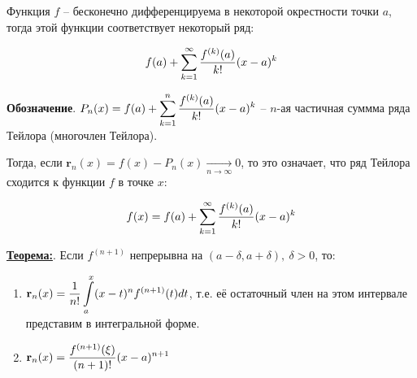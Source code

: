 \documentclass[a4paper,12pt]{article} %
\begin{document}
Функция $f$ -- бесконечно дифференцируема в некоторой окрестности точки $a$, тогда этой функции соответствует некоторый ряд: 

\begin{equation*}
\Large \displaystyle f(a) + \sum\limits_{k = 1}^{\infty} \frac{f^{(k)}(a)}{k!}(x-a)^k
\end{equation*}


\textbf{Обозначение}. $\Large \displaystyle P_n(x) = f(a) + \sum\limits_{k = 1}^{n} \frac{f^{(k)}(a)}{k!}(x-a)^k$ -- $n$-ая частичная суммма ряда Тейлора (многочлен Тейлора).

Тогда, если $\mathbf{r}_n(x) = f(x) - P_n(x) \underset{n \rightarrow \infty} \longrightarrow 0$, то это означает, что ряд Тейлора сходится к функции $f$ в точке $x$:

\begin{equation*}
\Large \displaystyle f(x) = f(a) + \sum\limits_{k = 1}^{\infty} \frac{f^{(k)}(a)}{k!}(x-a)^k
\end{equation*}

\underline{\textbf{Теорема:}}. Если $f^{(n+1)}$ непрерывна на $(a - \delta, a + \delta),\ \delta > 0$, то:

\begin{enumerate}
\item $\Large \displaystyle \mathbf{r}_n(x) = \frac{1}{n!} \int\limits_{a}^{x} (x - t)^nf^{(n+1)}(t)dt$, т.е. её остаточный член на этом интервале представим в интегральной форме.
\item $\Large \displaystyle \mathbf{r}_n(x) = \frac{f^{(n+1)}(\xi)}{(n+1)!}(x-a)^{n+1}$
\end{enumerate}
\end{document}
